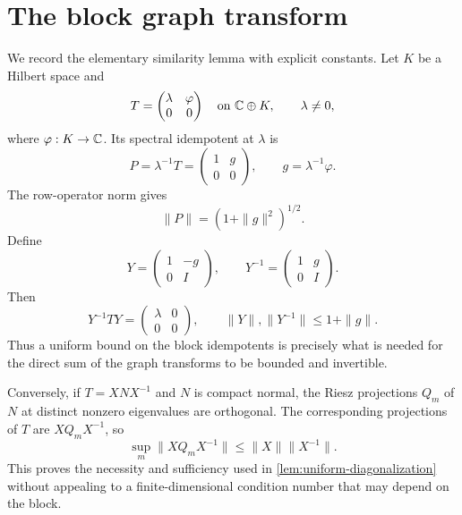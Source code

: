 \section{The block graph transform}
\label{app:graph-transform}

We record the elementary similarity lemma with explicit constants.  Let
$K$ be a Hilbert space and
\[
  T=\begin{pmatrix}\lambda&\varphi\\0&0\end{pmatrix}
  \quad\text{on }\mathbb C\oplus K,
  \qquad \lambda\ne0,
\]
where $\varphi:K\to\mathbb C$.  Its spectral idempotent at $\lambda$ is
\[
  P=\lambda^{-1}T
   =\begin{pmatrix}1&g\\0&0\end{pmatrix},
  \qquad g=\lambda^{-1}\varphi.
\]
The row-operator norm gives
\begin{equation}
  \|P\|=(1+\|g\|^2)^{1/2}.
  \label{eq:projection-graph-norm}
\end{equation}
Define
\[
  Y=\begin{pmatrix}1&-g\\0&I\end{pmatrix},
  \qquad
  Y^{-1}=\begin{pmatrix}1&g\\0&I\end{pmatrix}.
\]
Then
\begin{equation}
  Y^{-1}TY=\begin{pmatrix}\lambda&0\\0&0\end{pmatrix},
  \qquad
  \|Y\|,\|Y^{-1}\|\le1+\|g\|.
  \label{eq:graph-transform-bound}
\end{equation}
Thus a uniform bound on the block idempotents is precisely what is needed
for the direct sum of the graph transforms to be bounded and invertible.

Conversely, if $T=XNX^{-1}$ and $N$ is compact normal, the Riesz
projections $Q_m$ of $N$ at distinct nonzero eigenvalues are orthogonal.
The corresponding projections of $T$ are $XQ_mX^{-1}$, so
\[
  \sup_m\|XQ_mX^{-1}\|\le\|X\|\|X^{-1}\|.
\]
This proves the necessity and sufficiency used in
\cref{lem:uniform-diagonalization} without appealing to a finite-dimensional
condition number that may depend on the block.

